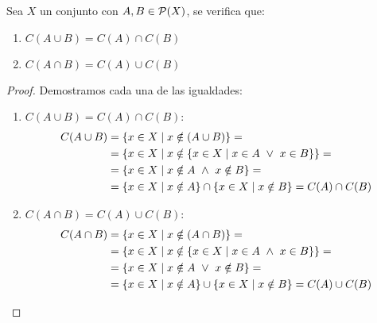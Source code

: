 \begin{prop}
    Sea $X$ un conjunto con $A, B \in \mathcal{P}(X)$, se verifica que:
    \begin{enumerate}
        \item $C(A \cup B) = C(A) \cap C(B)$
        \item $C(A \cap B) = C(A) \cup C(B)$
    \end{enumerate}
\end{prop}
\begin{proof} Demostramos cada una de las igualdades:
\begin{enumerate}
    \item $C(A \cup B) = C(A) \cap C(B)$:
    \begin{equation*}
        \begin{split}
            C(A \cup B) &= \{x \in X \mid x \notin (A \cup B)\} =\\
            & =\{x \in X \mid x \notin \{x \in X \mid x \in A \ \lor \  x \in B\} \} =\\
            & = \{x \in X \mid x \notin A \ \land \  x \notin B \} =\\
            & =\{x \in X \mid x \notin A\} \cap \{x \in X \mid x \notin B\} = C(A) \cap C(B)
        \end{split}
    \end{equation*}

    \item $C(A \cap B) = C(A) \cup C(B)$:
    \begin{equation*}
        \begin{split}
            C(A \cap B) &= \{x \in X \mid x \notin (A \cap B)\} =\\
            & =\{x \in X \mid x \notin \{x \in X \mid x \in A \ \land \  x \in B\} \} =\\
            & = \{x \in X \mid x \notin A \ \lor \  x \notin B \} =\\
            & =\{x \in X \mid x \notin A\} \cup \{x \in X \mid x \notin B\} = C(A) \cup C(B)
        \end{split}
    \end{equation*}
\end{enumerate}
\end{proof}

